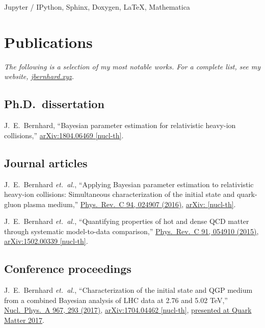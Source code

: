 \documentclass[letterpaper,10pt]{article}
\begin{document}
\begin{multicols}{2}
Jupyter / IPython, Sphinx, Doxygen, \LaTeX, Mathematica



\section{Publications}

\emph{%
  The following is a selection of my most notable works.
  For a complete list, see my website, \href{https://jbernhard.xyz}{jbernhard.xyz}.
}

\subsection{Ph.D.\ dissertation}

J.~E.~Bernhard,
``Bayesian parameter estimation for relativistic heavy-ion collisions,''
\href{https://arxiv.org/abs/1804.06469}{arXiv:1804.06469 [nucl-th]}.

\subsection{Journal articles}

J.~E.~Bernhard \textit{et.\ al.},
``Applying Bayesian parameter estimation to relativistic heavy-ion collisions: Simultaneous characterization of the initial state and quark-gluon plasma medium,''
\href{https://journals.aps.org/prc/abstract/10.1103/PhysRevC.94.024907}{Phys.\ Rev.\ C 94, 024907 (2016)},
\href{https://arxiv.org/abs/1605.03954}{arXiv: [nucl-th]}.

J.~E.~Bernhard \textit{et.\ al.},
``Quantifying properties of hot and dense QCD matter through systematic model-to-data comparison,''
\href{https://journals.aps.org/prc/abstract/10.1103/PhysRevC.91.054910}{Phys.\ Rev.\ C 91, 054910 (2015)},
\href{https://arxiv.org/abs/1502.00339}{arXiv:1502.00339 [nucl-th]}.


\subsection{Conference proceedings}

J.~E.~Bernhard \textit{et.\ al.},
``Characterization of the initial state and QGP medium from a combined Bayesian analysis of LHC data at 2.76 and 5.02 TeV,''
\href{https://www.sciencedirect.com/science/article/pii/S0375947417301549}{Nucl.\ Phys.\ A 967, 293 (2017)},
\href{https://arxiv.org/abs/1704.04462}{arXiv:1704.04462 [nucl-th]},
\href{https://indico.cern.ch/event/433345/contributions/2358284}{presented at Quark Matter 2017}.

\end{multicols}
\end{document}
